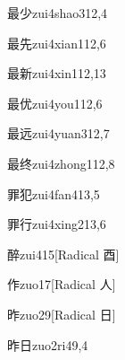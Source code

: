 \begin{entry}{最少}{zui4shao3}{12,4}
\end{entry}

\begin{entry}{最先}{zui4xian1}{12,6}
\end{entry}

\begin{entry}{最新}{zui4xin1}{12,13}
\end{entry}

\begin{entry}{最优}{zui4you1}{12,6}
\end{entry}

\begin{entry}{最远}{zui4yuan3}{12,7}
\end{entry}

\begin{entry}{最终}{zui4zhong1}{12,8}
\end{entry}

\begin{entry}{罪犯}{zui4fan4}{13,5}
\end{entry}

\begin{entry}{罪行}{zui4xing2}{13,6}
\end{entry}

\begin{entry}{醉}{zui4}{15}[Radical 酉]
\end{entry}

\begin{entry}{作}{zuo1}{7}[Radical 人]
\end{entry}

\begin{entry}{昨}{zuo2}{9}[Radical 日]
\end{entry}

\begin{entry}{昨日}{zuo2ri4}{9,4}
\end{entry}

